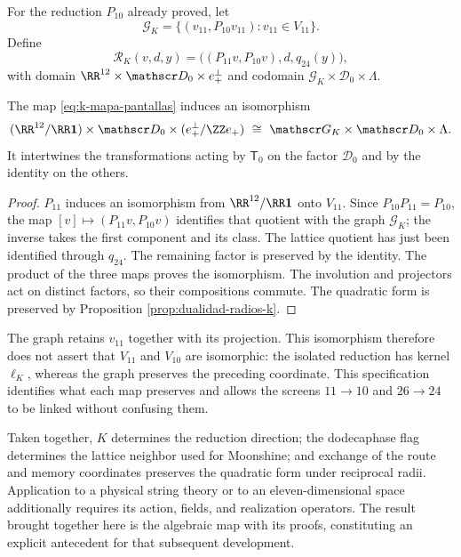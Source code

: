 For the reduction \(P_{10}\) already proved, let
\[
 \mathscr G_K=\{(v_{11},P_{10}v_{11}):v_{11}\in V_{11}\}.
\]
Define
\begin{equation}
 \mathcal R_K(v,d,y)
 =\bigl((P_{11}v,P_{10}v),d,q_{24}(y)\bigr),
 \label{eq:k-mapa-pantallas}
\end{equation}
with domain \(\RR^{12}\times\mathscr D_0\times e_+^\perp\)
and codomain \(\mathscr G_K\times\mathscr D_0\times\Lambda\).

\begin{theorem}
\label{thm:k-pantallas-coordinadas}
The map \eqref{eq:k-mapa-pantallas} induces an isomorphism
\[
 (\RR^{12}/\RR\mathbf1)\times\mathscr D_0
       \times(e_+^\perp/\ZZ e_+)
 \ \cong\ \mathscr G_K\times\mathscr D_0\times\Lambda.
\]
It intertwines the transformations acting by \(\mathsf T_0\)
on the factor \(\mathscr D_0\) and by the identity on the others.
\end{theorem}
\begin{proof}
\(P_{11}\) induces an isomorphism from \(\RR^{12}/\RR\mathbf1\)
onto \(V_{11}\). Since \(P_{10}P_{11}=P_{10}\), the map
\([v]\mapsto(P_{11}v,P_{10}v)\) identifies that quotient with
the graph \(\mathscr G_K\); the inverse takes the first component
and its class. The lattice quotient has just been identified through
\(q_{24}\). The remaining factor is preserved by the identity.
The product of the three maps proves the isomorphism. The
involution and projectors act on distinct factors, so
their compositions commute. The quadratic form is preserved
by Proposition \ref{prop:dualidad-radios-k}.
\end{proof}

The graph retains \(v_{11}\) together with its projection. This
isomorphism therefore does not assert that \(V_{11}\) and \(V_{10}\) are isomorphic:
the isolated reduction has kernel \(\ell_K\), whereas the graph
preserves the preceding coordinate. This specification identifies what each
map preserves and allows the screens \(11\to10\) and
\(26\to24\) to be linked without confusing them.

Taken together, \(K\) determines the reduction direction; the dodecaphase
flag determines the lattice neighbor used for Moonshine;
and exchange of the route and memory coordinates preserves the
quadratic form under reciprocal radii. Application to a physical
string theory or to an eleven-dimensional space additionally requires
its action, fields, and realization operators. The result brought together
here is the algebraic map with its proofs, constituting an
explicit antecedent for that subsequent development.
